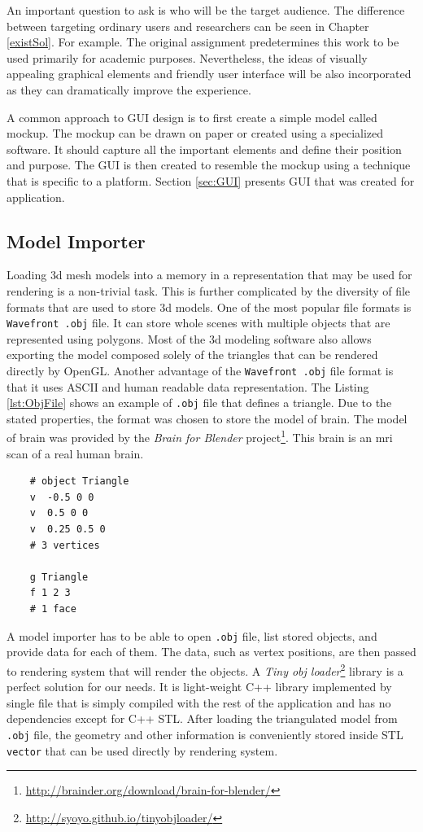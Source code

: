 An important question to ask is who will be the target audience. The difference between targeting ordinary users and researchers can be seen in Chapter \ref{existSol}. For example. The original assignment predetermines this work to be used primarily for academic purposes. Nevertheless, the ideas of visually appealing graphical elements and friendly user interface will be also incorporated as they can dramatically improve the experience.

A common approach to GUI design is to first create a simple model called mockup. The mockup can be drawn on paper or created using a specialized software. It should capture all the important elements and define their position and purpose. The GUI is then created to resemble the mockup using a technique that is specific to a platform. Section \ref{sec:GUI} presents GUI that was created for application. 

\subsection{Model Importer}
Loading \gls{3d} mesh models into a memory in a representation that may be used for rendering is a non-trivial task. This is further complicated by the diversity of file formats that are used to store \gls{3d} models. One of the most popular file formats is \texttt{Wavefront .obj} file. It can store whole scenes with multiple objects that are represented using polygons. Most of the \gls{3d} modeling software also allows exporting the model composed solely of the triangles that can be rendered directly by OpenGL. Another advantage of the \texttt{Wavefront .obj} file format is that it uses ASCII and human readable data representation. The Listing \ref{lst:ObjFile} shows an example of \texttt{.obj} file that defines a triangle. Due to the stated properties, the format was chosen to store the model of brain. The model of brain was provided by the \emph{Brain for Blender} project\footnote{\url{http://brainder.org/download/brain-for-blender/}}. This brain is an \gls{mri} scan of a real human brain.

\lstset{captionpos=b, caption=The .obj file example, label=lst:ObjFile}
\begin{lstlisting}
	# object Triangle
	v  -0.5 0 0
	v  0.5 0 0
	v  0.25 0.5 0
	# 3 vertices
	
	g Triangle
	f 1 2 3 
	# 1 face
\end{lstlisting}

A model importer has to be able to open \texttt{.obj} file, list stored objects, and provide data for each of them. The data, such as vertex positions, are then passed to rendering system that will render the objects. A \emph{Tiny obj loader}\footnote{\url{http://syoyo.github.io/tinyobjloader/}} library is a perfect solution for our needs. It is light-weight C++ library implemented by single file that is simply compiled with the rest of the application and has no dependencies except for C++ STL. After loading the triangulated model from \texttt{.obj} file, the geometry and other information is conveniently stored inside STL \texttt{vector} that can be used directly by rendering system.

